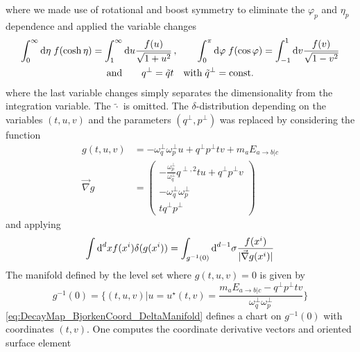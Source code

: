 where we made use of rotational and boost symmetry to eliminate the $\varphi_p$ and $\eta_p$ dependence and applied the variable changes
\begin{gather*}
    \int_0^\infty\text{d}\eta\;f(\cosh\eta)=\int_1^\infty\text{d} u\frac{f(u)}{\sqrt{1+u^2}}\,,\qquad \int_0^\pi\text{d}\varphi\;f(\cos\varphi)=\int_{-1}^1\text{d} v\frac{f(v)}{\sqrt{1-v^2}}\\
   \text{and}\qquad q^\perp=\tilde{q}t\quad\text{with}\;\tilde{q}^\perp={\text{const.}}
\end{gather*}
where the last variable changes simply separates the dimensionality from the integration variable. The $\tilde{\cdot}$ is omitted. The $\delta$-distribution depending on the variables $(t,u,v)$ and the parameters $(q^\perp,p^\perp)$ was replaced by considering the function
\begin{subequations}
    \begin{align}
        g(t,u,v)&=-\omega_q^\perp \omega_p^\perp u+q^\perp p^\perp tv+m_a E_{a\rightarrow b\vert c}\\
        \vec{\nabla} g&=
        \begin{pmatrix}
            -\frac{\omega_p^\perp}{\omega_q^\perp}q^{\perp,2} tu+q^\perp p^\perp v\\
            -\omega_q^\perp\omega_p^\perp\\
            tq^\perp p^\perp
        \end{pmatrix}
    \end{align}
\end{subequations}
and applying
\begin{equation}
    \int\text{d}^dx f(x^i)\delta(g(x^i))=\int_{g^{-1}(0)}\text{d}^{d-1}\sigma\frac{f(x^i)}{{\vert\vec{\nabla}g(x^i)\vert}}
\end{equation}
The manifold defined by the level set where $g(t,u,v)=0$ is given by 
\begin{equation}
    g^{-1}(0)=\Bigg\{(t,u,v)\Big\vert u=u^\star(t,v)=\frac{m_aE_{a\rightarrow b\vert c}-q^\perp p^\perp tv}{\omega_q^\perp\omega_p^\perp}\Bigg\}
    \label{eq:DecayMap_BjorkenCoord_DeltaManifold}
\end{equation}
\eqref{eq:DecayMap_BjorkenCoord_DeltaManifold} defines a chart on $g^{-1}(0)$ with coordinates $(t,v)$. One computes the coordinate derivative vectors and oriented surface element
